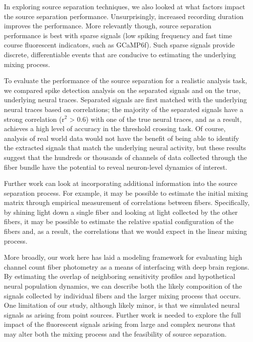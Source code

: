In exploring source separation techniques, we also looked at what factors impact the source separation performance. Unsurprisingly, increased recording duration improves the performance. More relevantly though, source separation performance is best with sparse signals (low spiking frequency and fast time course fluorescent indicators, such as GCaMP6f). Such sparse signals provide discrete, differentiable events that are conducive to estimating the underlying mixing process.

To evaluate the performance of the source separation for a realistic analysis task, we compared spike detection analysis on the separated signals and on the true, underlying neural traces. Separated signals are first matched with the underlying neural traces based on correlations; the majority of the separated signals have a strong correlation (r$^2$ > 0.6) with one of the true neural traces, and as a result, achieves a high level of accuracy in the threshold crossing task. Of course, analysis of real world data would not have the benefit of being able to identify the extracted signals that match the underlying neural activity, but these results suggest that the hundreds or thousands of channels of data collected through the fiber bundle have the potential to reveal neuron-level dynamics of interest.

Further work can look at incorporating additional information into the source separation process. For example, it may be possible to estimate the initial mixing matrix through empirical measurement of correlations between fibers. Specifically, by shining light down a single fiber and looking at light collected by the other fibers, it may be possible to estimate the relative spatial configuration of the fibers and, as a result, the correlations that we would expect in the linear mixing process.

More broadly, our work here has laid a modeling framework for evaluating high channel count fiber photometry as a means of interfacing with deep brain regions. By estimating the overlap of neighboring sensitivity profiles and hypothetical neural population dynamics, we can describe both the likely composition of the signals collected by individual fibers and the larger mixing process that occurs. One limitation of our study, although likely minor, is that we simulated neural signals as arising from point sources. Further work is needed to explore the full impact of the fluorescent signals arising from large and complex neurons that may alter both the mixing process and the feasibility of source separation.

